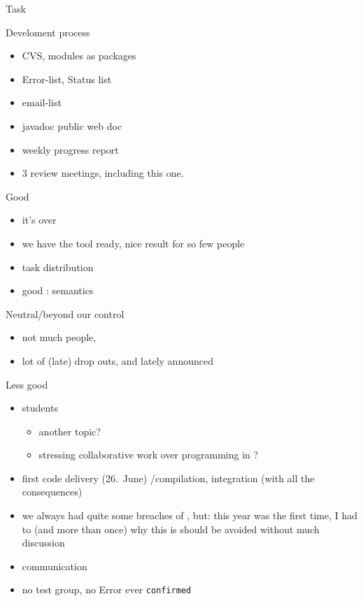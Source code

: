 


\begin{myslide}{Task}
  
\end{myslide}


\begin{myslide}{Develoment process}
  \begin{itemize}
  \item CVS, modules as packages
  \item Error-list, Status list
  \item email-list
  \item javadoc public web doc
  \item weekly progress report
  \item 3 review meetings, including this one. 
  \end{itemize}
\end{myslide}


\begin{myslide}{Good}
  \begin{itemize}
  \item it's over
  \item we have the tool ready, nice result for so few people
  \item task distribution
  \item good :  semantics
  \end{itemize}
  
\end{myslide}
\begin{myslide}{Neutral/beyond our control}
  \begin{itemize}
  \item not much people, 
  \item lot of (late) drop outs, and lately announced
  \end{itemize}
\end{myslide}

\begin{myslide}{Less good}
  \begin{itemize}
  \item {} students
    \begin{itemize}
    \item another topic?
    \item stressing collaborative  work over programming in \Java?
    \end{itemize}
  \item {} first code delivery (26.\ June) /compilation,
     integration (with all the consequences)
  \item we always had quite some breaches of , but:
    this year was the first time, I had to  (and more
    than once) why this is should be avoided without much discussion
  \item communication
  \item no test group, no Error ever \texttt{confirmed}
  \end{itemize}
\end{myslide}

